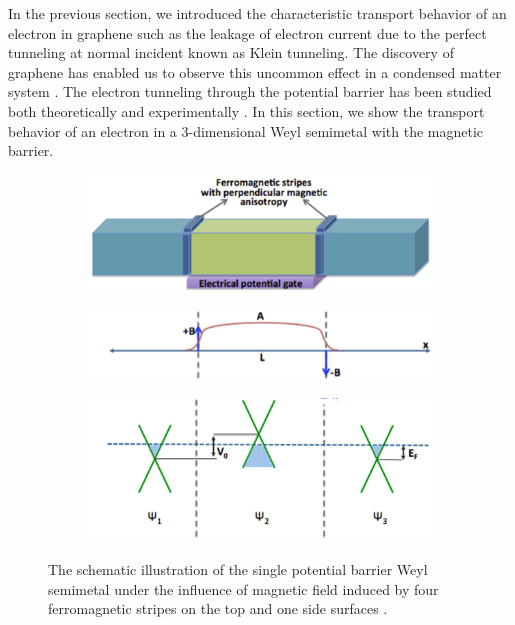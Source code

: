     In the previous section, we introduced the characteristic transport behavior of an electron in graphene such as the leakage of electron current due to the perfect tunneling at normal incident known as Klein tunneling.
    The discovery of graphene has enabled us to observe this uncommon effect in a condensed matter system \cite{Zhang2004}.
    The electron tunneling through the potential barrier has been studied both theoretically and experimentally \cite{Katsnelson2006a,Rahman2015,Allain2011}.
    In this section, we show the transport behavior of an electron in a 3-dimensional Weyl semimetal with the magnetic barrier.
    \begin{figure}[H]
        \centering
        \begin{subfigure}[b]{0.6\linewidth}
            \includegraphics[width = \linewidth]{fig/Chap 2/2weyl structure.png}
            \caption{}
            \label{2fig:weyl structure}
        \end{subfigure}
        \begin{subfigure}[b]{0.6\linewidth}
            \includegraphics[width = \linewidth]{fig/Chap 2/B field profile.png}
            \caption{}
            \label{2fig:b field profile}
        \end{subfigure}
        \begin{subfigure}[b]{0.6\linewidth}
            \includegraphics[width = \linewidth]{fig/Chap 2/three weyl cones.png}
            \caption{}
            \label{2fig:3 weyl cones}
        \end{subfigure}
        \caption{The schematic illustration of the single potential barrier Weyl semimetal under the influence of magnetic field 
                    induced by four ferromagnetic stripes on the top and one side surfaces \cite{Yesilyurt2016b}.}
        \label{2fig:weyl npn}
    \end{figure}
